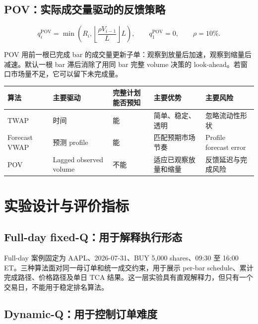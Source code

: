 \documentclass[11pt,a4paper,fontset=fandol]{ctexart}
\begin{document}
\subsection{POV：实际成交量驱动的反馈策略}

\begin{equation}
q_i^{\mathrm{POV}}
=\min\!\left(R_i,\left\lfloor\frac{\rho V_{i-1}}{L}\right\rfloor L\right),
\qquad q_1^{\mathrm{POV}}=0,
\qquad \rho=10\%.
\end{equation}

POV 用前一根已完成 bar 的成交量更新子单：观察到放量后加速，观察到缩量后减速。默认一根 bar 滞后消除了用同 bar 完整 volume 决策的 look-ahead。若窗口市场量不足，它可以留下未完成量。

\begin{table}[H]
\centering
\small
\begin{tabularx}{\textwidth}{p{2.2cm}p{2.6cm}p{2.8cm}XX}
\toprule
\textbf{算法} & \textbf{主要驱动} & \textbf{完整计划能否预知} & \textbf{主要优势} & \textbf{主要风险} \\
\midrule
TWAP & 时间 & 能 & 简单、稳定、透明 & 忽略流动性形状 \\
Forecast VWAP & 预测 profile & 能 & 匹配预期市场节奏 & Profile forecast error \\
POV & Lagged observed volume & 不能 & 适应已观察放量和缩量 & 反馈延迟与完成风险 \\
\bottomrule
\end{tabularx}
\end{table}

\clearpage
\section{实验设计与评价指标}

\subsection{Full-day fixed-Q：用于解释执行形态}

Full-day 案例固定为 AAPL、2026-07-31、BUY 5,000 shares、09:30 至 16:00 ET。三种算法面对同一母订单和统一成交约束，用于展示 per-bar schedule、累计完成路径、价格路径及单日 TCA 结果。这一层实验具有直观解释力，但只有一个交易日，不能用于稳定排名算法。

\subsection{Dynamic-Q：用于控制订单难度}
\end{document}
